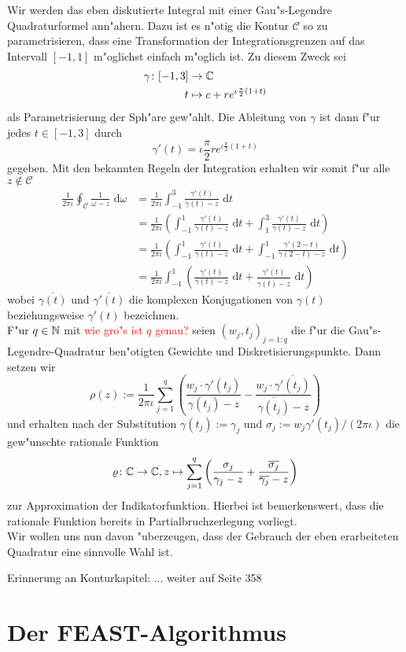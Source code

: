 Wir werden das eben diskutierte Integral mit einer Gau"s-Legendre Quadraturformel ann"ahern.
Dazu ist es n"otig die Kontur $\mathcal{C}$ so zu parametrisieren, dass eine Transformation
der Integrationsgrenzen auf das Intervall $[-1,1]$ m"oglichst einfach m"oglich ist. Zu diesem Zweck sei
\begin{align*}
\gamma\colon[-1,3]&\to\mathbb{C} \\
t&\mapsto c+re^{\iota \frac{\pi}{2}(1+t)}
\end{align*}
als Parametrisierung der Sph"are gew"ahlt. Die
Ableitung von $\gamma$ ist dann f"ur jedes $t\in[-1,3]$ durch
\[
\gamma'(t)=\iota \frac{\pi}{2}re^{\iota \frac{\pi}{2}(1+t)}
\]
gegeben. Mit den bekannten Regeln der Integration erhalten wir somit f"ur alle $z\notin\mathcal{C}$
\begin{align*}
\frac{1}{2\pi\iota}\oint_{ \mathcal{C}}\frac{1}{\omega-z}\text{ d}\omega
&= \frac{1}{2\pi\iota} \int_{-1}^3 \frac{\gamma'(t)}{\gamma(t)-z}\text{ d}t \\
&= \frac{1}{2\pi\iota} \left( \int_{-1}^1 \frac{\gamma'(t)}{\gamma(t)-z} \text{ d}t +
\int_{1}^3\frac{\gamma'(t)}{\gamma(t)-z}\text{ d}t \right) \\
&= \frac{1}{2\pi\iota} \left( \int_{-1}^1 \frac{\gamma'(t)}{\gamma(t)-z} \text{ d}t +
\int_{-1}^1\frac{\gamma'(2-t)}{\gamma(2-t)-z}\text{ d}t \right) \\
&= \frac{1}{2\pi\iota} \int_{-1}^1 \left( \frac{\gamma'(t)}{\gamma(t)-z} \text{ d}t +
\frac{\overline{\gamma'(t)}}{\overline{\gamma(t)}-z}\text{ d}t \right)
\end{align*}
wobei $\overline{\gamma(t)}$ und $\overline{\gamma'(t)}$ die komplexen Konjugationen
von $\gamma(t)$ beziehungsweise $\gamma'(t)$ bezeichnen.\\

F"ur $q\in\mathbb{N}$ mit \textcolor{red}{wie gro"s ist $q$ genau?} seien $(w_j, t_j)_{j=1:q}$
die f"ur die Gau"s-Legendre-Quadratur ben"otigten Gewichte und Diskretisierungspunkte.
Dann setzen wir
\[
\rho(z) := \frac{1}{2\pi\iota}\sum_{j=1}^q \left(
\frac{w_j \cdot \gamma'(t_j)}{\gamma(t_j)-z} - \frac{w_j \cdot \overline{\gamma'(t_j)}}{\overline{\gamma(t_j)}-z}
\right)
\]
und erhalten nach der Substitution $\gamma(t_j) := \gamma_j$ und
$\sigma_j := w_j \gamma'(t_j) / (2\pi\iota)$ die gew"unschte rationale
Funktion
\[
\varrho\colon\mathbb{C}\to\mathbb{C}, z\mapsto\sum_{j=1}^q\left(\frac{\sigma_j}{\gamma_j - z} +
\frac{\overline{\sigma_j}}{\overline{\gamma_j} - z}\right)
\]
zur Approximation der Indikatorfunktion. Hierbei ist bemerkenswert, dass die
rationale Funktion bereits in Partialbruchzerlegung vorliegt.\\

Wir wollen uns nun davon "uberzeugen, dass der Gebrauch der eben erarbeiteten
Quadratur eine sinnvolle Wahl ist.

Erinnerung an Konturkapitel: ... weiter auf Seite 358
\section{Der FEAST-Algorithmus}
